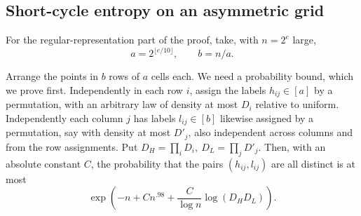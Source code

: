 \subsection{Short-cycle entropy on an asymmetric grid}
\label{tra:asymmetric:grid-sizes}
For the regular-representation part of the proof, take, with \(n=2^e\) large,
\[
             a=2^{\lfloor e/10\rfloor},\qquad b=n/a.
\]
\begin{proposition}\label{tra:asymmetric:compatibility}
\label{tra:asymmetric:compatibility-statement}
Arrange the points in \(b\) rows of \(a\) cells each. We need a probability bound, which we prove first. Independently in each row \(i\), assign the labels \(h_{ij}\in[a]\) by a permutation, with an arbitrary law of density at most \(D_i\) relative to uniform. Independently each column \(j\) has labels \(l_{ij}\in[b]\) likewise assigned by a permutation, say with density at most \(D'_j\), also independent across columns and from the row assignments. Put \(D_H=\prod_i D_i,\ D_L=\prod_j D'_j\). Then, with an absolute constant \(C\), the probability that the pairs \((h_{ij},l_{ij})\) are all distinct is at most
\begin{equation}
                \exp\left(-n+C n^{.98}
                        +\frac{C}{\log n}\log(D_H D_L)\right).
                     \label{tra:asymmetric:eq6}
\end{equation}
\end{proposition}
